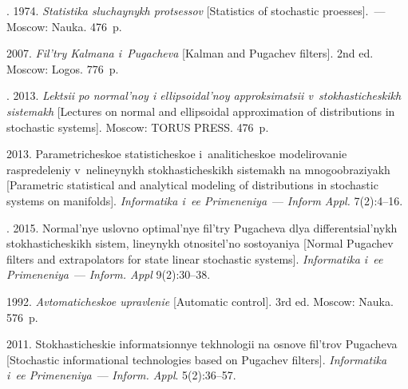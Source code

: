  \begin{multicols}{2}

\renewcommand{\bibname}{\protect\rmfamily References}

{\small\frenchspacing
 {%
 \begin{thebibliography}{9}




. 1974. 
\textit{Statistika sluchaynykh protsessov} [Statistics of stochastic proesses].~--- 
Moscow: Nauka. 476~p.

 2007.
\textit{Fil'try Kalmana i~Pugacheva} [Kalman and Pugachev filters]. 2nd ed. Moscow: Logos. 776~p.

. 2013. 
\textit{Lektsii po normal'noy i ellipsoidal'noy approksimatsii 
v~stokhasticheskikh sistemakh}  [Lectures on normal and ellipsoidal approximation 
of distributions in stochastic systems].  Moscow: TORUS PRESS. 476~p.

 2013. 
Parametricheskoe statisticheskoe i~analiticheskoe modelirovanie raspredeleniy 
v~nelineynykh stokhasticheskikh sistemakh na mnogoobraziyakh [Parametric statistical 
and analytical modeling of distributions in stochastic systems on manifolds].
\textit{Informatika i~ee Primeneniya}~--- \textit{Inform Appl.} 7(2):4--16.

. 2015.
Nor\-mal'\-nye uslovno optimal'nye fil'try Pugacheva dlya dif\-fe\-ren\-tsi\-al'\-nykh 
stokhasticheskikh sistem, lineynykh otnositel'no so\-sto\-yaniya [Normal Pugachev 
filters and extrapolators for state linear stochastic systems].
\textit{Informatika i~ee Primeneniya}~--- \textit{Inform. Appl}  9(2):30--38.

 1992. 
\textit{Avtomaticheskoe upravlenie} 
[Automatic control]. 3rd ed. Moscow: Nauka. 576~p.

 2011. 
Stokhasticheskie informatsionnye tekhnologii na osnove fil'trov Pugacheva 
[Stochastic informational technologies based on Pugachev filters].
\textit{Informatika i~ee Primeneniya}~--- \textit{Inform. Appl}. 5(2):36--57.
\end{thebibliography}

 }
 }

\end{multicols}

